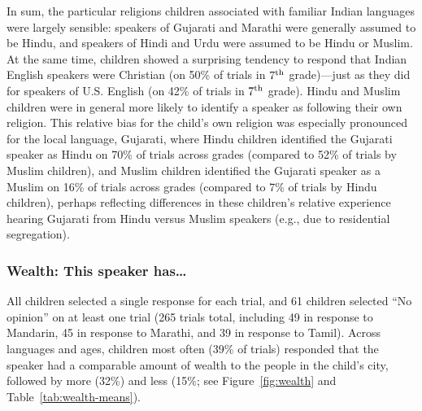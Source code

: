 \documentclass{foushee-adapted-preprint}
\newcommand{\wealthmeanstab}{\ref{tab:wealth-means}}
\begin{document}
In sum, the particular religions children associated with familiar Indian languages were largely sensible: speakers of Gujarati and Marathi were generally assumed to be Hindu, and speakers of Hindi and Urdu were assumed to be Hindu or Muslim. At the same time, children showed a surprising tendency to respond that Indian English speakers were Christian (on 50\% of trials in $7^{\textnormal{th}}$ grade)---just as they did for speakers of U.S. English (on 42\% of trials in $7^{\textnormal{th}}$ grade).  
Hindu and Muslim children were in general more likely to identify a speaker as following their own religion. %
This relative bias for the child's own religion was especially pronounced for the local language, Gujarati, where Hindu children identified the Gujarati speaker as Hindu on 70\% of trials across grades (compared to 52\% of trials by Muslim children), and Muslim children identified the Gujarati speaker as a Muslim on 16\% of trials across grades (compared to 7\% of trials by Hindu children), perhaps reflecting differences in these children's relative experience hearing Gujarati from Hindu versus Muslim speakers (e.g., due to residential segregation). 
\subsubsection*{Wealth: This speaker has\ldots} 
All children selected a single response for each trial, and 61 children selected ``No opinion'' on at least one trial (265 trials total, including 49 in response to Mandarin, 45 in response to Marathi, and 39 in response to Tamil). 
Across languages and ages, children most often (39\% of trials) responded that the speaker had a comparable amount of wealth to the people in the child's city, followed by more (32\%) and less (15\%; see Figure~\ref{fig:wealth} and Table~\wealthmeanstab).
\end{document}
